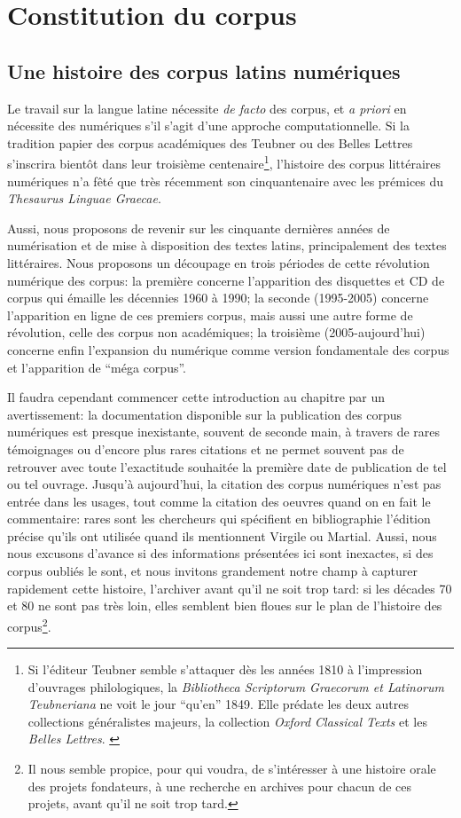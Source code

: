 \chapter{Constitution du corpus}

\section{Une histoire des corpus latins numériques}

Le travail sur la langue latine nécessite \textit{de facto} des corpus, et \textit{a priori} en nécessite des numériques s'il s'agit d'une approche computationnelle. Si la tradition papier des corpus académiques des Teubner ou des Belles Lettres s'inscrira bientôt dans leur troisième centenaire\footnote{Si l'éditeur Teubner semble s'attaquer dès les années 1810 à l'impression d'ouvrages philologiques, la \textit{Bibliotheca Scriptorum Graecorum et Latinorum Teubneriana} ne voit le jour \enquote{qu'en} 1849. Elle prédate les deux autres collections généralistes majeurs, la collection \textit{Oxford Classical Texts} et les \textit{Belles Lettres}. \cite{andre_cent-cinquante_1974}}, l'histoire des corpus littéraires numériques n'a fêté que très récemment son cinquantenaire avec les prémices du \textit{Thesaurus Linguae Graecae}.

Aussi, nous proposons de revenir sur les cinquante dernières années de numérisation et de mise à disposition des textes latins, principalement des textes littéraires. Nous proposons un découpage en trois périodes de cette révolution numérique des corpus: la première concerne l'apparition des disquettes et CD de corpus qui émaille les décennies 1960 à 1990; la seconde (1995-2005) concerne l'apparition en ligne de ces premiers corpus, mais aussi une autre forme de révolution, celle des corpus non académiques; la troisième (2005-aujourd'hui) concerne enfin l'expansion du numérique comme version fondamentale des corpus et l'apparition de \enquote{méga corpus}.

Il faudra cependant commencer cette introduction au chapitre par un avertissement: la documentation disponible sur la publication des corpus numériques est presque inexistante, souvent de seconde main, à travers de rares témoignages ou d'encore plus rares citations et ne permet souvent pas de retrouver avec toute l'exactitude souhaitée la première date de publication de tel ou tel ouvrage. Jusqu'à aujourd'hui, la citation des corpus numériques n'est pas entrée dans les usages, tout comme la citation des oeuvres quand on en fait le commentaire: rares sont les chercheurs qui spécifient en bibliographie l'édition précise qu'ils ont utilisée quand ils mentionnent Virgile ou Martial. Aussi, nous nous excusons d'avance  si des informations présentées ici sont inexactes, si des corpus oubliés le sont, et nous invitons grandement notre champ à capturer rapidement cette histoire, l'archiver avant qu'il ne soit trop tard: si les décades 70 et 80 ne sont pas très loin, elles semblent bien floues sur le plan de l'histoire des corpus\footnote{Il nous semble propice, pour qui voudra, de s'intéresser à une histoire orale des projets fondateurs, à une recherche en archives pour chacun de ces projets, avant qu'il ne soit trop tard.}.

